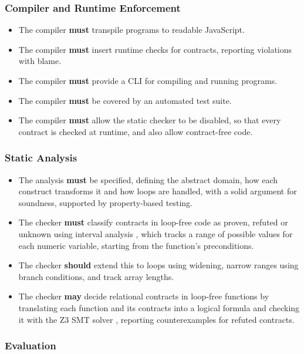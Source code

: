 \documentclass[11pt,a4paper,titlepage]{article}
\begin{document}
\subsubsection{Compiler and Runtime Enforcement}
\begin{itemize}
  \item The compiler \textbf{must} transpile programs to readable JavaScript.
  \item The compiler \textbf{must} insert runtime checks for contracts, reporting violations with blame.
  \item The compiler \textbf{must} provide a CLI for compiling and running programs.
  \item The compiler \textbf{must} be covered by an automated test suite.
  \item The compiler \textbf{must} allow the static checker to be disabled, so that every contract is checked at runtime, and also allow contract-free code.
\end{itemize}

\subsubsection{Static Analysis}
\begin{itemize}
  \item The analysis \textbf{must} be specified, defining the abstract domain, how each construct transforms it and how loops are handled, with a solid argument for soundness, supported by property-based testing.
  \item The checker \textbf{must} classify contracts in loop-free code as proven, refuted or unknown using interval analysis \parencite{moller2026spa}, which tracks a range of possible values for each numeric variable, starting from the function's preconditions.
  \item The checker \textbf{should} extend this to loops using widening, narrow ranges using branch conditions, and track array lengths.
  \item The checker \textbf{may} decide relational contracts in loop-free functions by translating each function and its contracts into a logical formula and checking it with the Z3 SMT solver \parencite{demoura2008z3}, reporting counterexamples for refuted contracts.
\end{itemize}

\subsubsection{Evaluation}
\end{document}
